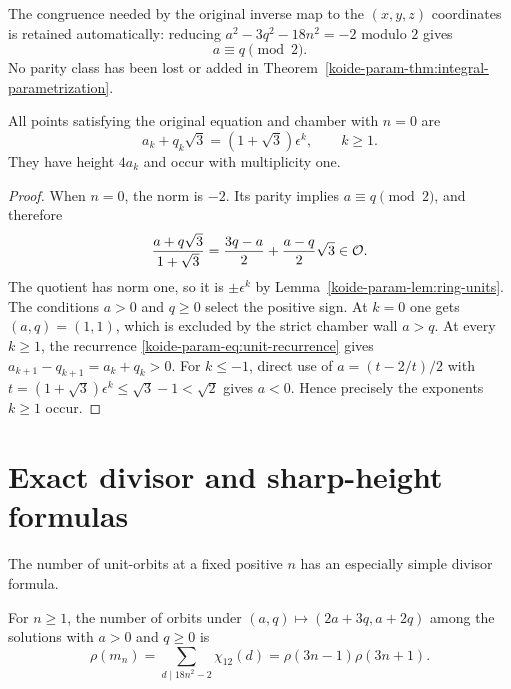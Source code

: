 The congruence needed by the original inverse map to the $(x,y,z)$
coordinates is retained automatically: reducing
$a^2-3q^2-18n^2=-2$ modulo $2$ gives
\begin{equation}
 a\equiv q\pmod2.
 \label{koide-param-eq:parity}
\end{equation}
No parity class has been lost or added in
Theorem~\ref{koide-param-thm:integral-parametrization}.

\begin{proposition}[The face $n=0$]
\label{koide-param-prop:n-zero}
All points satisfying the original equation and chamber with $n=0$ are
\begin{equation}
 a_k+q_k\sqrt3=(1+\sqrt3)\epsilon^k,\qquad k\geq1.
 \label{koide-param-eq:n-zero-family}
\end{equation}
They have height $4a_k$ and occur with multiplicity one.
\end{proposition}

\begin{proof}
When $n=0$, the norm is $-2$.  Its parity implies $a\equiv q\pmod2$, and
therefore
\[
 \frac{a+q\sqrt3}{1+\sqrt3}
 =\frac{3q-a}{2}+\frac{a-q}{2}\sqrt3\in\mathcal O.
\]
The quotient has norm one, so it is $\pm\epsilon^k$ by
Lemma~\ref{koide-param-lem:ring-units}.  The conditions $a>0$ and $q\geq0$ select the
positive sign.  At $k=0$ one gets $(a,q)=(1,1)$, which is excluded by the
strict chamber wall $a>q$.  At every $k\geq1$, the recurrence
\eqref{koide-param-eq:unit-recurrence} gives
$a_{k+1}-q_{k+1}=a_k+q_k>0$.  For $k\leq-1$, direct use of
$a=(t-2/t)/2$ with $t=(1+\sqrt3)\epsilon^k\leq\sqrt3-1<\sqrt2$
gives $a<0$.  Hence precisely the exponents $k\geq1$ occur.
\end{proof}

\section{Exact divisor and sharp-height formulas}

The number of unit-orbits at a fixed positive $n$ has an especially simple
divisor formula.

\begin{proposition}
\label{koide-param-prop:orbit-divisor}
For $n\geq1$, the number of orbits under
\((a,q)\mapsto(2a+3q,a+2q)\) among the solutions with $a>0$ and
$q\geq0$ is
\begin{equation}
 \rho(m_n)=\sum_{d\mid18n^2-2}\chi_{12}(d)
 =\rho(3n-1)\rho(3n+1).
 \label{koide-param-eq:orbit-divisor-sum}
\end{equation}
\end{proposition}

